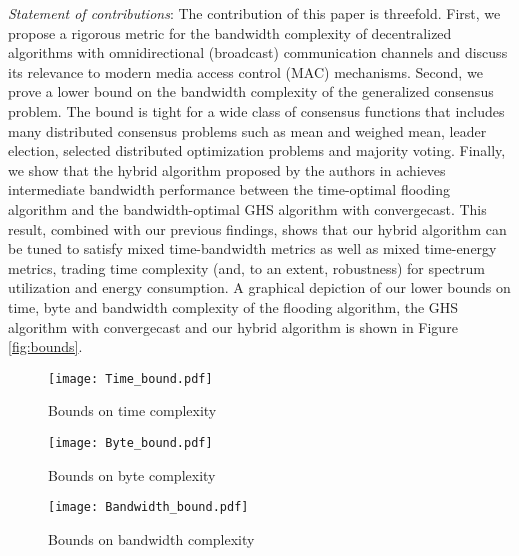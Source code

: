 \documentclass[letterpaper,10pt,conference]{ieeeconf}
\begin{document}
\emph{Statement of contributions}:
The contribution of this paper is threefold. First, we propose a rigorous metric for the bandwidth complexity of decentralized algorithms with omnidirectional (broadcast) communication channels and discuss its relevance to modern media access control (MAC) mechanisms. Second, we prove a lower bound on the bandwidth complexity of the generalized consensus problem. The bound is tight for a wide class of consensus functions that includes many distributed consensus problems such as mean and weighed mean, leader election, selected distributed optimization problems and majority voting. Finally, we show that the hybrid algorithm proposed by the authors in \cite{FR-MP:13} achieves intermediate bandwidth performance between the time-optimal flooding algorithm and the bandwidth-optimal GHS algorithm with convergecast. This result, combined with our previous findings, shows that our hybrid algorithm can be tuned to satisfy mixed time-bandwidth metrics as well as mixed time-energy metrics, trading time complexity (and, to an extent, robustness) for spectrum utilization and energy consumption. A graphical depiction of our lower bounds on time, byte and bandwidth complexity of the flooding algorithm, the GHS algorithm with convergecast and our hybrid algorithm is shown in Figure \ref{fig:bounds}.
\begin{figure*}[h!tp]
\centering
\begin{subfigure}[h]{0.3\textwidth}
\texttt{[image: Time\_bound.pdf]}
\caption{Bounds on time complexity}
\end{subfigure}
\begin{subfigure}[h]{0.3\textwidth}
\texttt{[image: Byte\_bound.pdf]}
\caption{Bounds on byte complexity}
\end{subfigure}
\begin{subfigure}[h]{0.3\textwidth}
\texttt{[image: Bandwidth\_bound.pdf]}
\caption{Bounds on bandwidth complexity}
\end{subfigure}
\caption{Bounds on time, byte and bandwidth complexity of the flooding algorithm (in blue, dashed), GHS algorithm with convergecast (in green, dash-dotted) and of our hybrid algorithm (in red, solid) as a function of the tuning parameter  for a network of size  with state size  bits.
Our hybrid algorithm recovers the time-optimal performance of the flooding algorithm as . Conversely, the hybrid algorithm recovers the byte and bandwidth performance of the byte-optimal and bandwidth-optimal GHS algorithm with convergecast, presented in Section \ref{sec:algs}, as .}
\label{fig:bounds}
\end{figure*}
\end{document}
